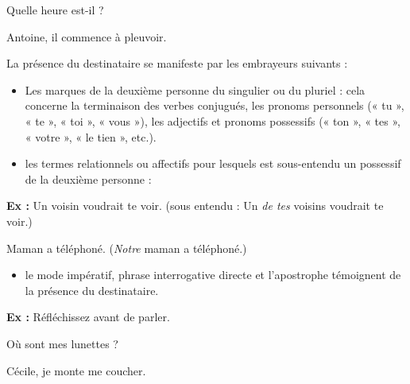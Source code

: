 \hspace*{1.5em}Quelle heure est-il ?

\hspace*{1.5em}Antoine, il commence à pleuvoir.

La présence du destinataire se manifeste par les embrayeurs suivants :

\begin{itemize}
\item Les marques de la deuxième personne du singulier ou du pluriel : cela concerne la terminaison des verbes conjugués, les pronoms personnels (« tu », « te », « toi », « vous »), les adjectifs et pronoms possessifs (« ton », « tes », « votre », « le tien », etc.).
\item les termes relationnels ou affectifs pour lesquels est sous-entendu un possessif de la deuxième personne :
\end{itemize}
\textbf{Ex :} Un voisin voudrait te voir. (sous entendu : Un \textit{de tes} voisins voudrait te voir.)

\hspace*{1.5em}Maman a téléphoné. (\textit{Notre} maman a téléphoné.)
\begin{itemize}
\item le mode impératif, phrase interrogative directe et l’apostrophe témoignent de la présence du destinataire.
\end{itemize}
\textbf{Ex :} Réfléchissez avant de parler.

\hspace*{1.5em}Où sont mes lunettes ?

\hspace*{1.5em}Cécile, je monte me coucher.

